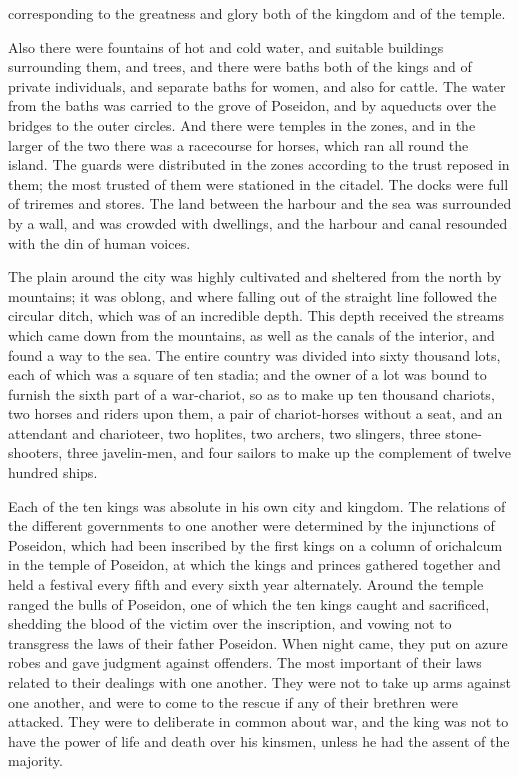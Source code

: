 \documentclass[11pt,letter]{article}
\begin{document}
corresponding to the greatness and glory both of the kingdom and of the temple.

\par  Also there were fountains of hot and cold water, and suitable buildings surrounding them, and trees, and there were baths both of the kings and of private individuals, and separate baths for women, and also for cattle. The water from the baths was carried to the grove of Poseidon, and by aqueducts over the bridges to the outer circles. And there were temples in the zones, and in the larger of the two there was a racecourse for horses, which ran all round the island. The guards were distributed in the zones according to the trust reposed in them; the most trusted of them were stationed in the citadel. The docks were full of triremes and stores. The land between the harbour and the sea was surrounded by a wall, and was crowded with dwellings, and the harbour and canal resounded with the din of human voices.

\par  The plain around the city was highly cultivated and sheltered from the north by mountains; it was oblong, and where falling out of the straight line followed the circular ditch, which was of an incredible depth. This depth received the streams which came down from the mountains, as well as the canals of the interior, and found a way to the sea. The entire country was divided into sixty thousand lots, each of which was a square of ten stadia; and the owner of a lot was bound to furnish the sixth part of a war-chariot, so as to make up ten thousand chariots, two horses and riders upon them, a pair of chariot-horses without a seat, and an attendant and charioteer, two hoplites, two archers, two slingers, three stone-shooters, three javelin-men, and four sailors to make up the complement of twelve hundred ships.

\par  Each of the ten kings was absolute in his own city and kingdom. The relations of the different governments to one another were determined by the injunctions of Poseidon, which had been inscribed by the first kings on a column of orichalcum in the temple of Poseidon, at which the kings and princes gathered together and held a festival every fifth and every sixth year alternately. Around the temple ranged the bulls of Poseidon, one of which the ten kings caught and sacrificed, shedding the blood of the victim over the inscription, and vowing not to transgress the laws of their father Poseidon. When night came, they put on azure robes and gave judgment against offenders. The most important of their laws related to their dealings with one another. They were not to take up arms against one another, and were to come to the rescue if any of their brethren were attacked. They were to deliberate in common about war, and the king was not to have the power of life and death over his kinsmen, unless he had the assent of the majority.
\end{document}
